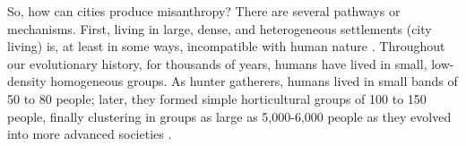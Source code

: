 \documentclass[11pt, letterpaper]{article}
\begin{document}
\begin{spacing}{1.4}

So, how can cities produce misanthropy? There are several pathways or mechanisms. 
First, living in large, dense, and heterogeneous settlements (city living) is, at least in some ways, incompatible with human nature \citep{haidt12B}. Throughout our evolutionary
history, for thousands of years, humans have lived in small, low-density
homogeneous groups. As hunter gatherers, humans lived in small bands of 50 to 80
people; later, they formed simple horticultural groups of 100 to 150 people,
finally clustering in groups as large as 5,000-6,000  people as they evolved
into more advanced societies \citep{maryanski92}.




\end{spacing}
\end{document}
